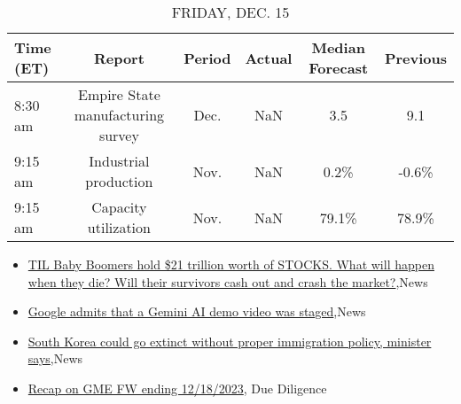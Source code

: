 \documentclass{article}%
\begin{document}
%


\begin{table}[htbp]%
\caption{FRIDAY, DEC. 15}%
\centering%
\begin{adjustbox}{width=1\textwidth}%
\begin{tabular}{lccccc}
\toprule
Time (ET) &                            Report & Period & Actual & Median Forecast & Previous \\
\midrule
  8:30 am & Empire State manufacturing survey &   Dec. &    NaN &             3.5 &      9.1 \\
  9:15 am &             Industrial production &   Nov. &    NaN &            0.2\% &    -0.6\% \\
  9:15 am &              Capacity utilization &   Nov. &    NaN &           79.1\% &    78.9\% \\
\bottomrule
\end{tabular}
%
\end{adjustbox}%
\end{table}

%
\begin{itemize}%
\item%
\href{https://reddit.com/r/wallstreetbets/comments/18e7i4k/til\_baby\_boomers\_hold\_21\_trillion\_worth\_of\_stocks/}{TIL Baby Boomers hold \$21 trillion worth of STOCKS. What will happen when they die? Will their survivors cash out and crash the market?},News%
\item%
\href{https://reddit.com/r/wallstreetbets/comments/18e532n/google\_admits\_that\_a\_gemini\_ai\_demo\_video\_was/}{Google admits that a Gemini AI demo video was staged},News%
\item%
\href{https://reddit.com/r/Economics/comments/18e5jo3/south\_korea\_could\_go\_extinct\_without\_proper/}{South Korea could go extinct without proper immigration policy, minister says},News%
\item%
\href{https://reddit.com/r/Superstonk/comments/18e4wm5/recap\_on\_gme\_fw\_ending\_12182023/}{Recap on GME FW ending 12/18/2023}, Due Diligence%
\end{itemize}%
\end{document}
